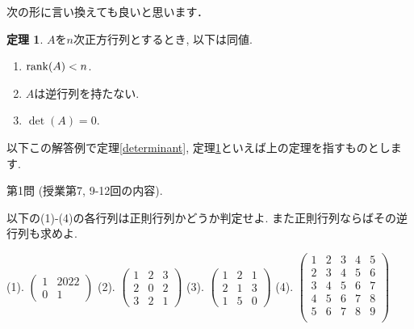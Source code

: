 \documentclass[dvipdfmx,a4paper,11pt]{article}
\theoremstyle{definition}
\newtheorem{thm}{定理}
\begin{document}
次の形に言い換えても良いと思います．
  \begin{tcolorbox}[
    colback = white,
    colframe = green!35!black,
    fonttitle = \bfseries,
    breakable = true]
    \begin{thm}
    \label{determinant_2}
    $A$を$n$次正方行列とするとき, 以下は同値.
\begin{enumerate}
\item $\rank (A) < n$.
\item $A$は逆行列を持たない.
\item $\det(A)= 0$.
\end{enumerate}
  \end{thm}
 \end{tcolorbox}
以下この解答例で定理\ref{determinant}, 定理\ref{determinant_2}といえば上の定理を指すものとします.
  \vspace{22pt}
 
{\Large 第1問} (授業第7, 9-12回の内容).
 
 \vspace{11pt}
以下の(1)-(4)の各行列は正則行列かどうか判定せよ. また正則行列ならばその逆行列も求めよ.
 
  \vspace{11pt}
 (1).
 $
 \begin{pmatrix}
1& 2022 \\
0& 1
 \end{pmatrix}
 $
(2).
$
 \begin{pmatrix}
1 &2&3 \\
2 & 0 & 2\\
3&2 &1
 \end{pmatrix}
 $
(3).
$
 \begin{pmatrix}
1 &2&1 \\
2 & 1& 3\\
1&5 &0
 \end{pmatrix}
 $
 (4).
 $
 \begin{pmatrix}
 1& 2& 3  & 4&5\\
 2& 3& 4  & 5&6\\
 3& 4& 5 & 6&7\\
 4& 5& 6 & 7&8\\
 5& 6& 7 & 8&9\\
 \end{pmatrix}
 $
\end{document}
